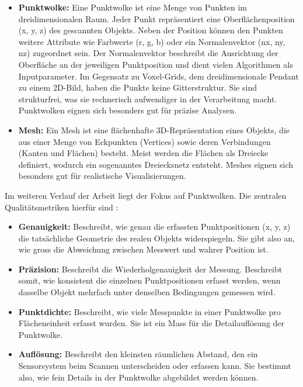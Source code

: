 \begin{German}
    \begin{itemize}
        \item \textbf{Punktwolke:} Eine Punktwolke ist eine Menge von Punkten im dreidimensionalen Raum. Jeder Punkt repräsentiert eine Oberflächenposition (x, y, z) des gescannten Objekts. Neben der Position können den Punkten weitere Attribute wie Farbwerte (r, g, b) oder ein Normalenvektor (nx, ny, nz) zugeordnet sein. Der Normalenvektor beschreibt die Ausrichtung der Oberfläche an der jeweiligen Punktposition und dient vielen Algorithmen als Inputparameter. Im Gegensatz zu Voxel-Grids, dem dreidimensionale Pendant zu einem 2D-Bild, haben die Punkte keine Gitterstruktur. Sie sind strukturfrei, was sie rechnerisch aufwendiger in der Verarbeitung macht. Punktwolken eignen sich besonders gut für präzise Analysen. 
        \item \textbf{Mesh:} Ein Mesh ist eine flächenhafte 3D-Repräsentation eines Objekts, die aus einer Menge von Eckpunkten (Vertices) sowie deren Verbindungen (Kanten und Flächen) besteht. Meist werden die Flächen als Dreiecke definiert, wodurch ein sogenanntes Dreiecksnetz entsteht. Meshes eignen sich besonders gut für realistische Visualisierungen.
    \end{itemize}

    Im weiteren Verlauf der Arbeit liegt der Fokus auf Punktwolken. Die zentralen Qualitätsmetriken hierfür sind \cite{rashdiScanningTechnologiesBuilding2022}:


    \begin{itemize}
        \item \textbf{Genauigkeit:} Beschreibt, wie genau die erfassten Punktpositionen (x, y, z) die tatsächliche Geometrie des realen Objekts widerspiegeln. Sie gibt also an, wie gross die Abweichung zwischen Messwert und wahrer Position ist.
        \item \textbf{Präzision:} Beschreibt die Wiederholgenauigkeit der Messung. Beschreibt somit, wie konsistent die einzelnen Punktpositionen erfasst werden, wenn dasselbe Objekt mehrfach unter denselben Bedingungen gemessen wird.
        \item \textbf{Punktdichte:} Beschreibt, wie viele Messpunkte in einer Punktwolke pro Flächeneinheit erfasst wurden. Sie ist ein Mass für die Detailauflösung der Punktwolke.
        \item \textbf{Auflösung:} Beschreibt den kleinsten räumlichen Abstand, den ein Sensorsystem beim Scannen unterscheiden oder erfassen kann. Sie bestimmt also, wie fein Details in der Punktwolke abgebildet werden können.
    \end{itemize}

\end{German}

